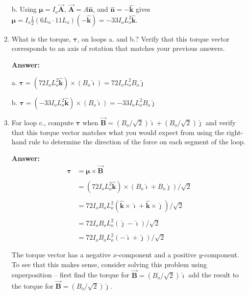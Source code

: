 \documentclass{article}
\newcommand{\ihat}[0]{\hat{\boldsymbol{\imath}}}
\newcommand{\jhat}[0]{\hat{\boldsymbol{\jmath}}}
\newcommand{\khat}[0]{\hat{\boldsymbol{k}}}
\newcommand{\bfvec}[1]{\vec{\mathbf{#1}}}
\begin{document}
\begin{enumerate}
        b.  Using $\boldsymbol{\mu} = I_o\bfvec{A}$, $\bfvec{A} = A\hat{\mathbf{n}}$, and $\hat{\mathbf{n}} = -\khat$ gives $\boldsymbol{\mu } = I_o\frac{1}{2}(6L_o\cdot 11 L_o)(-\khat) = -33I_oL_o^2\khat$.
        \else
        \vskip 56.25pt
        \fi

  \item What is the torque, $\boldsymbol{\tau}$, on loops a. and b.? Verify that this torque vector corresponds to an axis of rotation that matches your previous answers.

        \ifsolutions
        {\bf Answer: }

        a. $\boldsymbol{\tau}= (72I_oL_o^2\khat)\times (B_o\ihat)= 72I_oL_o^2B_o\jhat$

        b. $\boldsymbol{\tau}= (-33I_oL_o^2\khat)\times (B_o\ihat)= -33I_oL_o^2B_o\jhat$
        \else
        \vskip 56.25pt
        \fi

  \item For loop c., compute $\boldsymbol{\tau}$ when $\bfvec{B}=(B_o/\sqrt{2})\ihat + (B_o/\sqrt{2})\jhat$ and verify that this torque vector matches what you would expect from using the right-hand rule to determine the direction of the force on each segment of the loop.

        \ifsolutions
        {\bf Answer: }
        $$
        \begin{align*}
        \boldsymbol{\tau} & = \boldsymbol{\mu}\times\bfvec{B} \\\\
        &  =(72I_oL_o^2\khat)\times (B_o\ihat+B_o\jhat)/\sqrt{2}\\\\
        & = 72I_oB_oL_o^2(\khat\times \ihat + \khat\times \jhat)/\sqrt{2}\\\\
        & = 72I_oB_oL_o^2(\jhat-\ihat)/\sqrt{2}\\\\
        & = 72I_oB_oL_o^2(-\ihat+\jhat)/\sqrt{2}
        \end{align*}
        $$

        The torque vector has a negative $x$-component and a positive $y$-component. To see that this makes sense, consider solving this problem using superposition -- first find the torque for $\bfvec{B}=(B_o/\sqrt{2})\ihat$ add the result to the torque for $\bfvec{B}=(B_o/\sqrt{2})\jhat$.
        \else
        \vskip 56.25pt
        \fi

\end{enumerate}
\end{document}
